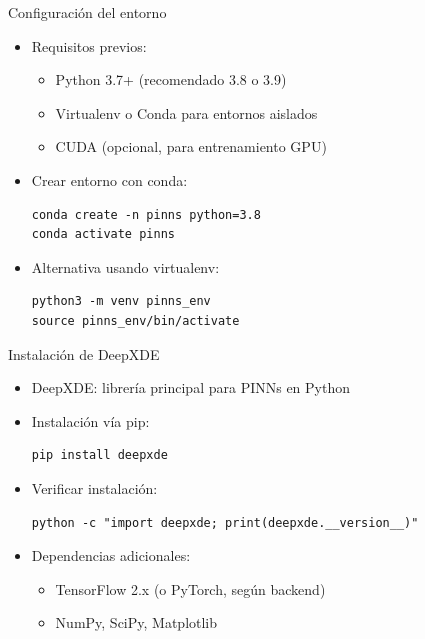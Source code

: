 
\begin{frame}{Configuración del entorno}
  \begin{itemize}
    \item Requisitos previos:
      \begin{itemize}
        \item Python 3.7+ (recomendado 3.8 o 3.9)
        \item Virtualenv o Conda para entornos aislados
        \item CUDA (opcional, para entrenamiento GPU)
      \end{itemize}
    \item Crear entorno con conda:
      \begin{block}{}
        \begin{verbatim}
conda create -n pinns python=3.8
conda activate pinns
        \end{verbatim}
      \end{block}
    \item Alternativa usando virtualenv:
      \begin{block}{}
        \begin{verbatim}
python3 -m venv pinns_env
source pinns_env/bin/activate
        \end{verbatim}
      \end{block}
  \end{itemize}
\end{frame}

\begin{frame}{Instalación de DeepXDE}
  \begin{itemize}
    \item DeepXDE: librería principal para PINNs en Python
    \item Instalación vía pip:
      \begin{block}{}
        \begin{verbatim}
pip install deepxde
        \end{verbatim}
      \end{block}
    \item Verificar instalación:
      \begin{block}{}
        \begin{verbatim}
python -c "import deepxde; print(deepxde.__version__)"
        \end{verbatim}
      \end{block}
    \item Dependencias adicionales:
      \begin{itemize}
        \item TensorFlow 2.x (o PyTorch, según backend)
        \item NumPy, SciPy, Matplotlib
      \end{itemize}
  \end{itemize}
\end{frame}

